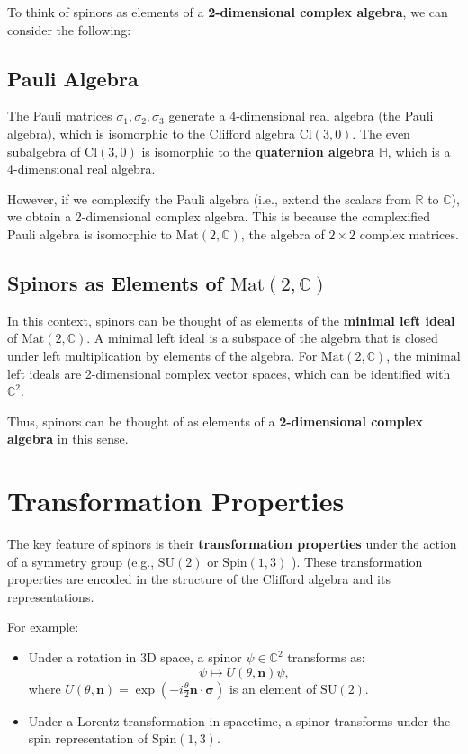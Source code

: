 \documentclass{article}
\begin{document}
To think of spinors as elements of a \textbf{2-dimensional complex algebra},
we can consider the following:

\subsection*{Pauli Algebra}

The Pauli matrices $\sigma_1, \sigma_2, \sigma_3$ generate a 4-dimensional
real algebra (the Pauli algebra), which is isomorphic to the Clifford
algebra $\text{Cl}(3, 0)$. The even subalgebra of $\text{Cl}(3, 0)$ is
isomorphic to the \textbf{quaternion algebra} $\mathbb{H}$, which is a
4-dimensional real algebra.

However, if we complexify the Pauli algebra (i.e., extend the scalars from $%
\mathbb{R}$ to $\mathbb{C}$), we obtain a 2-dimensional complex algebra.
This is because the complexified Pauli algebra is isomorphic to $\text{Mat}%
(2, \mathbb{C})$, the algebra of $2 \times 2$ complex matrices.

\subsection*{Spinors as Elements of $\text{Mat}(2, \mathbb{C})$}

In this context, spinors can be thought of as elements of the \textbf{%
minimal left ideal} of $\text{Mat}(2, \mathbb{C})$. A minimal left ideal is
a subspace of the algebra that is closed under left multiplication by
elements of the algebra. For $\text{Mat}(2, \mathbb{C})$, the minimal left
ideals are 2-dimensional complex vector spaces, which can be identified with 
$\mathbb{C}^2$.

Thus, spinors can be thought of as elements of a \textbf{2-dimensional
complex algebra} in this sense.

\section*{Transformation Properties}

The key feature of spinors is their \textbf{transformation properties} under
the action of a symmetry group (e.g., $\text{SU}(2)$ or $\text{Spin}(1, 3)$%
). These transformation properties are encoded in the structure of the
Clifford algebra and its representations.

For example:

\begin{itemize}
\item Under a rotation in 3D space, a spinor $\psi \in \mathbb{C}^2$
transforms as:  
\begin{equation*}
\psi \mapsto U(\theta, \mathbf{n}) \psi,  
\end{equation*}
where $U(\theta, \mathbf{n}) = \exp\left( -i \frac{\theta}{2} \mathbf{n}
\cdot \boldsymbol{\sigma} \right)$ is an element of $\text{SU}(2)$. 

\item Under a Lorentz transformation in spacetime, a spinor transforms under
the spin representation of $\text{Spin}(1, 3)$.
\end{itemize}
\end{document}

